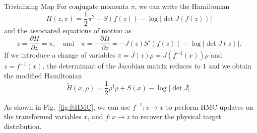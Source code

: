 \documentclass[final]{beamer}
\newlength{\colwidth}
\begin{document}
\begin{frame}[t]
\begin{columns}[t]
\begin{column}{\colwidth}
\begin{block}{Trivializing Map}
    For conjugate momenta \(\pi\), we can write the Hamiltonian 
    \begin{equation}
      H(z, \pi) = \frac{1}{2}\pi^{2} + S(f(z)) - \log|\det J(f(z))|
    \end{equation}
    and the associated equations of motion as 
    \begin{equation}
      \dot z = \frac{\partial H}{\partial z} = \pi,%
        \quad\text{and}\quad%
        \dot{\pi} = -\frac{\partial H}{\partial z} = -J(z) S'(f(z)) - \log|\det J(z)|.
    \end{equation}
    If we introduce a change of variables \(\pi = J(z)\rho = J(f^{-1}(x))\rho\) and \(z = f^{-1}(x)\), the determinant
    of the Jacobian matrix reduces to \(1\) and we obtain the modified Hamiltonian
    \begin{equation}
      \tilde H(x,\rho) = \frac{1}{2}\rho^{\dagger}\rho + S(x) - \log|\det J|.
    \end{equation}

    As shown in Fig.~\ref{fig:ftHMC}, we can use \(f^{-1}: z\rightarrow x \) to perform HMC updates on the transformed
    variables \(x\), and \(f: x\rightarrow z\) to recover the physical target distribution.


  \end{block}

\end{column}


\end{columns}
\end{frame}
\end{document}
